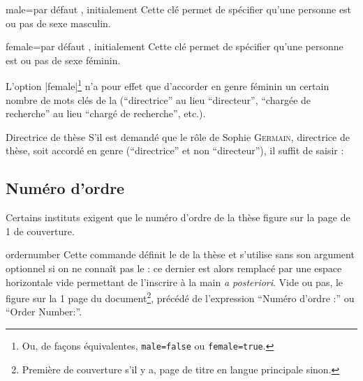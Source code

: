 \begin{docKey}{male}{=\textbar{}}{par défaut
    , initialement }
  Cette clé permet de spécifier qu'une personne est ou pas de sexe masculin.
\end{docKey}

\begin{docKey}{female}{=\textbar{}}{par défaut
    , initialement }
  Cette clé permet de spécifier qu'une personne est ou pas de sexe féminin.
\end{docKey}

L'option |female|\footnote{Ou, de façons équivalentes,
  \protect\lstinline+male=false+ ou \protect\lstinline+female=true+.} n'a pour
effet que d'accorder en genre féminin un certain nombre de mots clés de la
\yatcl{} (\enquote{directrice} au lieu \enquote{directeur}, \enquote{chargée de
  recherche} au lieu \enquote{chargé de recherche}, etc.).

\begin{dbexample}{Directrice de thèse}{}
  S'il est demandé que le rôle de Sophie \textsc{Germain}, directrice de thèse,
  soit accordé en genre (\enquote{directrice} et non \enquote{directeur}), il
  suffit de saisir :
\begin{preamblecode}[title=Par exemple dans le \File{\characteristicsfile}]
\end{preamblecode}
\end{dbexample}

\subsection{Numéro d'ordre}
\label{sec-numero-dordre}

Certains instituts exigent que le numéro d'ordre de la thèse figure sur la page
de 1\iere{} de couverture.

\begin{docCommand}{ordernumber}{}
  Cette commande définit le  de la thèse et s'utilise sans
  son argument optionnel si on ne connaît pas  le  : ce dernier est alors remplacé par une espace horizontale vide
  permettant de l'inscrire à la main \emph{a posteriori}. Vide ou pas, le
   figure sur  la 1\iere{} page
  du document\footnote{Première de couverture s'il y a, page de titre en langue
    principale sinon.}, précédé de l'expression \enquote{Num\'ero d'ordre :} ou
  \foreignquote{english}{Order Number:}\selonlangue.
\end{docCommand}

